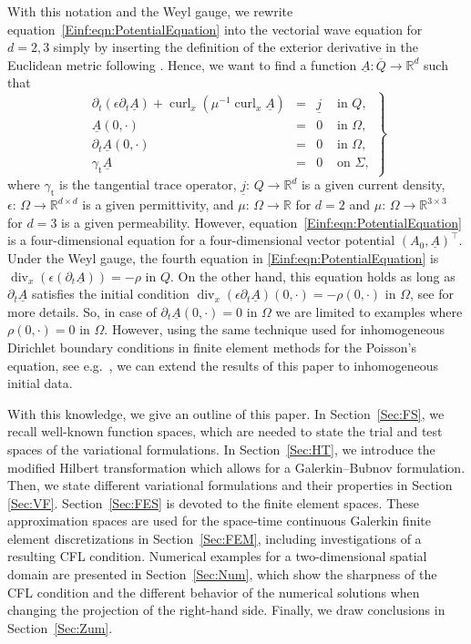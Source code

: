 \documentclass[a4paper,11pt]{article}
\newcommand{\R}{\mathbb R}
\newcommand{\cu}{\operatorname{curl}}
\newcommand{\di}{\operatorname{div}}
\newcommand{\trt}{\gamma_\mathrm{t}}
\renewcommand{\vec}[1]{\underline{#1}}
\begin{document}
	With this notation and the Weyl gauge, we rewrite equation~\eqref{Einf:eqn:PotentialEquation} into the vectorial wave equation for $d=2,3$ simply by inserting the definition of the exterior derivative in the Euclidean metric following \cite[Chapter~2]{ArnoldFalkWinther}. Hence, we want to find a function $\vec A \colon \overline{Q} \to \R^d$ such that
	\begin{equation}  \label{Einf:Maxwell}
		\left.
		\begin{array}{rcll}
			\partial_t \left( \epsilon \partial_t \vec A\right) + \cu_x \left(\mu^{-1} \cu_x \vec{A} \right) &=& \vec{j} &\text{ in } Q, \\
			\vec{A}(0,\cdot) &=& 0 &\text{ in } \Omega, \\
			\partial_t\vec{A}(0,\cdot) &=& 0 &\text{ in } \Omega, \\
			\trt\vec A&=& 0  &\text{ on } \Sigma,
		\end{array}
		\right \}
	\end{equation}
	where $\trt$ is the tangential trace operator, $\vec j \colon \, Q \to \R^d$ is a given current density, $\epsilon \colon \, \Omega \to \R^{d \times d}$ is a given permittivity, and $\mu \colon \, \Omega \to \R$ for $d=2$ and $\mu \colon \, \Omega \to \R^{3 \times 3}$ for $d=3$ is a given permeability.
	However, equation~\eqref{Einf:eqn:PotentialEquation} is a four-dimensional equation for a four-dimensional vector potential $(A_0,\underline{A})^\top$. Under the Weyl gauge, the fourth equation in \eqref{Einf:eqn:PotentialEquation} is $\di_x(\epsilon (\partial_t\vec{A}))=-\rho$  in $Q$. On the other hand, this equation holds
	as long as $\partial_t\underline{A}$ satisfies the initial condition $\di_x(\epsilon\partial_t\underline{A})(0,\cdot)=-\rho(0,\cdot)$ in $\Omega$, see \cite{HauserOhm2023} for more details. So, in case of $\partial_t\vec{A}(0,\cdot) = 0$ in $\Omega$ we are limited to examples where $\rho(0,\cdot) = 0$ in $\Omega$. However, using the same technique used for inhomogeneous Dirichlet boundary conditions in finite element methods for the Poisson's equation, see e.g.~\cite{ErnGuermond2020II}, we can extend the results of this paper to inhomogeneous initial data.	
	
	With this knowledge, we give an outline of this paper. In Section~\ref{Sec:FS}, we recall well-known function spaces, which are needed to state the trial and test spaces of the variational formulations. In Section~\ref{Sec:HT}, we introduce the modified Hilbert transformation which allows for a Galerkin--Bubnov formulation. Then, we state different variational formulations and their properties in Section \ref{Sec:VF}.
	Section~\ref{Sec:FES} is devoted to the finite element spaces. These approximation spaces are used for the space-time continuous Galerkin finite element discretizations in Section~\ref{Sec:FEM}, including investigations of a resulting CFL condition.
	Numerical examples for a two-dimensional spatial domain are presented in Section~\ref{Sec:Num}, which show the sharpness of the CFL condition and the different behavior of the numerical solutions when changing the projection of the right-hand side. Finally, we draw conclusions in Section~\ref{Sec:Zum}.
	
\end{document}
